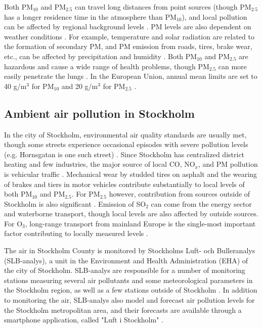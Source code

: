 Both PM$_{10}$ and PM$_{2.5}$ can travel long distances from point sources (though PM$_{2.5}$ has a longer residence time in the atmosphere than PM$_{10}$), and local pollution can be affected by regional background levels \cite{Schwarzenbach2016, slbanalys}. PM levels are also dependent on weather conditions \cite{Schwarzenbach2016}. For example, temperature and solar radiation are related to the formation of secondary PM, and PM emission from roads, tires, brake wear, etc., can be affected by precipitation and humidity \cite{slbanalys, atmos7020015}. Both PM$_{10}$ and PM$_{2.5}$ are hazardous and cause a wide range of health problems, though PM$_{2.5}$ can more easily penetrate the lungs \cite{Schwarzenbach2016}. In the European Union, annual mean limits are set to 40 \textmugreek g/m$^3$ for PM$_{10}$ and 20 \textmugreek g/m$^3$ for PM$_{2.5}$ \cite{eu-airquality}. 

\subsection{Ambient air pollution in Stockholm}
\label{air-pollution-stockholm}

In the city of Stockholm, environmental air quality standards are usually met, though some streets experience occasional episodes with severe pollution levels (e.g. Hornsgatan is one such street) \cite{slbanalys2021}. Since Stockholm has centralized district heating and few industries, the major source of local CO, NO$_x$, and PM pollution is vehicular traffic \cite{slbanalys, slbanalys2021}. Mechanical wear by studded tires on asphalt and the wearing of brakes and tiers in motor vehicles contribute substantially to local levels of both PM$_{10}$ and PM$_{2.5}$. For PM$_{2.5}$ however, contribution from sources outside of Stockholm is also significant \cite{slbanalys2021}. Emission of SO$_2$ can come from the energy sector and waterborne transport, though local levels are also affected by outside sources. 
For O$_3$, long-range transport from mainland Europe is the single-most important factor contributing to locally measured levels \cite{slbanalys2021}. 

The air in Stockholm County is monitored by Stockholms Luft- och Bulleranalys (SLB-analys), a unit in the Environment and Health Administration (EHA) of the city of Stockholm. SLB-analys are responsible for a number of monitoring stations measuring several air pollutants and some meteorological parameters in the Stockholm region, as well as a few stations outside of Stockholm \cite{slb-matningar}. In addition to monitoring the air, SLB-analys also model and forecast air pollution levels for the Stockholm metropolitan area, and their forecasts are available through a smartphone application, called "Luft i Stockholm" \cite{slbanalys}. 

